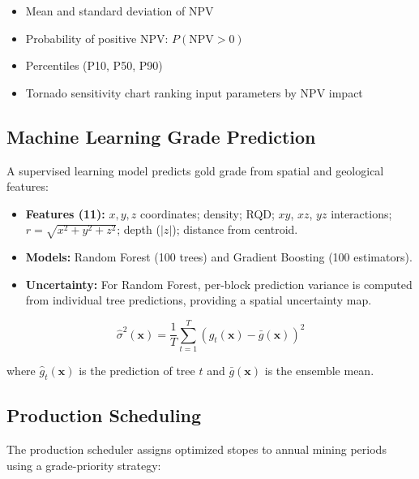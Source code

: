 \documentclass[12pt,a4paper]{article}
\begin{document}
\begin{itemize}[itemsep=0.1em]
    \item Mean and standard deviation of NPV
    \item Probability of positive NPV: $P(\text{NPV} > 0)$
    \item Percentiles (P10, P50, P90)
    \item Tornado sensitivity chart ranking input parameters by NPV impact
\end{itemize}

\subsection{Machine Learning Grade Prediction}
\label{sec:ml}

A supervised learning model predicts gold grade from spatial and geological features:

\begin{itemize}[itemsep=0.1em]
    \item \textbf{Features (11):} $x, y, z$ coordinates; density; RQD; $xy$, $xz$, $yz$ interactions; $r = \sqrt{x^2+y^2+z^2}$; depth ($|z|$); distance from centroid.
    \item \textbf{Models:} Random Forest (100 trees) and Gradient Boosting (100 estimators).
    \item \textbf{Uncertainty:} For Random Forest, per-block prediction variance is computed from individual tree predictions, providing a spatial uncertainty map.
\end{itemize}

\begin{equation}
    \hat{\sigma}^2(\mathbf{x}) = \frac{1}{T} \sum_{t=1}^{T} \left( \hat{g}_t(\mathbf{x}) - \bar{g}(\mathbf{x}) \right)^2
\end{equation}

where $\hat{g}_t(\mathbf{x})$ is the prediction of tree $t$ and $\bar{g}(\mathbf{x})$ is the ensemble mean.

\subsection{Production Scheduling}
\label{sec:scheduling}

The production scheduler assigns optimized stopes to annual mining periods using a grade-priority strategy:
\end{document}
